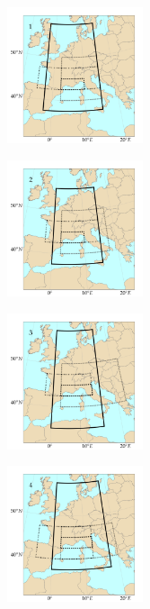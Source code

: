 \documentclass[twocol]{ametsoc}
\begin{document}
\begin{figure}[htb]
	\centering
	\begin{subfigure}{.5\columnwidth}
		\centering
		\includegraphics[width=4cm]{figures/spatial_win_z4/Spatial_windows_1.png}
	\end{subfigure}%
	\begin{subfigure}{.5\columnwidth}
		\centering
		\includegraphics[width=4cm]{figures/spatial_win_z4/Spatial_windows_2.png}
	\end{subfigure}
	\begin{subfigure}{.5\columnwidth}
		\centering
		\includegraphics[width=4cm]{figures/spatial_win_z4/Spatial_windows_3.png}
	\end{subfigure}%
	\begin{subfigure}{.5\columnwidth}
		\centering
		\includegraphics[width=4cm]{figures/spatial_win_z4/Spatial_windows_4.png}
	\end{subfigure}

\end{figure}
\end{document}
